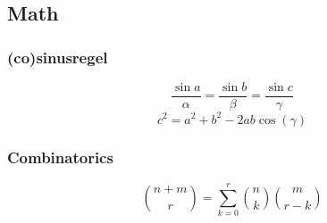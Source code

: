 \documentclass[10pt]{article}
\begin{document}
\subsection{Math}
\subsubsection{(co)sinusregel}
\[\frac{\sin a}{\alpha} = \frac{\sin b}{\beta} =\frac{\sin c}{\gamma}\]
\[c^2=a^2+b^2-2ab\cos(\gamma)\]
\subsubsection{Combinatorics}
\[\binom{n+m}{r} = \sum_{k=0}^r \binom{n}{k} \binom{m}{r-k}\]
\end{document}
